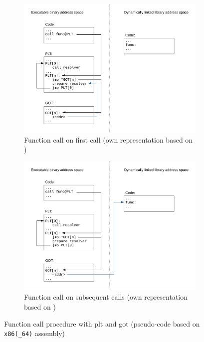 \begin{figure}[htb]
	\centering
	\begin{subfigure}[t]{0.49\textwidth}
		\centering
		\includegraphics[width=\textwidth]{figures/lazy-binding-1}
		\caption{Function call on first call (own representation based on \cite{Bendersky2011})}
		\label{fig:lazy-binding-1}
	\end{subfigure}
	\hfill
	\begin{subfigure}[t]{0.49\textwidth}
		\centering
		\includegraphics[width=\textwidth]{figures/lazy-binding-2}
		\caption{Function call on subsequent calls (own representation based on \cite{Bendersky2011})}
		\label{fig:lazy-binding-2}
	\end{subfigure}
	\caption{Function call procedure with \acs{plt} and \acs{got} (pseudo-code based on \texttt{x86(\_64)} assembly)}
	\label{fig:lazy-binding}
\end{figure}
